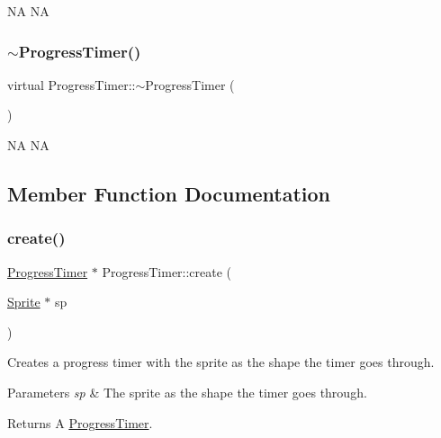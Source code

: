 NA  NA \mbox{\label{classProgressTimer_ae5b642ead8174fcbc4d5684fceb86a55}} 
\subsubsection{\texorpdfstring{$\sim$\+Progress\+Timer()}{~ProgressTimer()}\hspace{0.1cm}{\footnotesize\ttfamily [2/2]}}
{\footnotesize\ttfamily virtual Progress\+Timer\+::$\sim$\+Progress\+Timer (\begin{DoxyParamCaption}{ }\end{DoxyParamCaption})\hspace{0.3cm}{\ttfamily [virtual]}}

NA  NA 

\subsection{Member Function Documentation}
\mbox{\label{classProgressTimer_a04df0bb71ad5378f3d70abcb8ceb0123}} 
\subsubsection{\texorpdfstring{create()}{create()}\hspace{0.1cm}{\footnotesize\ttfamily [1/2]}}
{\footnotesize\ttfamily \hyperlink{classProgressTimer}{Progress\+Timer} $\ast$ Progress\+Timer\+::create (\begin{DoxyParamCaption}\item[{\hyperlink{classSprite}{Sprite} $\ast$}]{sp }\end{DoxyParamCaption})\hspace{0.3cm}{\ttfamily [static]}}

Creates a progress timer with the sprite as the shape the timer goes through.


\begin{DoxyParams}{Parameters}
{\em sp} & The sprite as the shape the timer goes through. \\
\hline
\end{DoxyParams}
\begin{DoxyReturn}{Returns}
A \hyperlink{classProgressTimer}{Progress\+Timer}. 
\end{DoxyReturn}
\mbox{\label{classProgressTimer_ae4b5741da712802b7f09859b21e0f69f}} 
